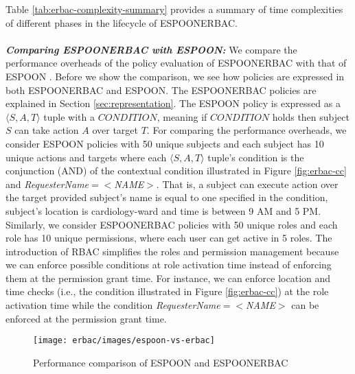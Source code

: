\documentclass[epsfig,a4paper,11pt,titlepage]{book}
\numberwithin{algorithm}{chapter}
\begin{document}
Table \ref{tab:erbac-complexity-summary} provides a summary of time complexities of different phases in the lifecycle of \gls{ESPOONERBAC}. \\ \\
\noindent \emph{\textbf{Comparing \gls{ESPOONERBAC} with \gls{ESPOON}:}}
We compare the performance overheads of the policy evaluation of \gls{ESPOONERBAC} with that of \gls{ESPOON} \cite{Asghar2011-ARES}. Before we show the comparison, we see how policies are expressed in both \gls{ESPOONERBAC} and \gls{ESPOON}. The \gls{ESPOONERBAC} policies are explained in Section \ref{sec:representation}. The \gls{ESPOON} policy is expressed as a $\langle S, A, T \rangle$ tuple with a $\mathit{CONDITION}$, meaning if $\mathit{CONDITION}$ holds then subject $S$ can take action $A$ over target $T$. For comparing the performance overheads, we consider \gls{ESPOON} policies with 50 unique subjects and each subject has 10 unique actions and targets where each $\langle S, A, T \rangle$ tuple's condition is the conjunction (AND) of the contextual condition illustrated in Figure \ref{fig:erbac-cc} and \emph{RequesterName$=<$NAME$>$}. That is, a subject can execute action over the target provided subject's name is equal to one specified in the condition, subject's location is cardiology-ward and time is between 9 AM and 5 PM. Similarly, we consider \gls{ESPOONERBAC} policies with 50 unique roles and each role has 10 unique permissions, where each user can get active in 5 roles. The introduction of \gls{RBAC} simplifies the roles and permission management because we can enforce possible conditions at role activation time instead of enforcing them at the permission grant time. For instance, we can enforce location and time checks (i.e., the condition illustrated in Figure \ref{fig:erbac-cc}) at the role activation time while the condition \emph{RequesterName$=<$NAME$>$} can be enforced at the permission grant time.

\begin{figure} [htp]
\centering
\texttt{[image: erbac/images/espoon-vs-erbac]}
\caption[Performance comparison of ESPOON and ESPOON$_{\mathit{ERBAC}}$]{Performance comparison of \gls{ESPOON} and \gls{ESPOONERBAC}}
\label{fig:erbac-espoon-vs-erbac}
\end{figure}
\end{document}
